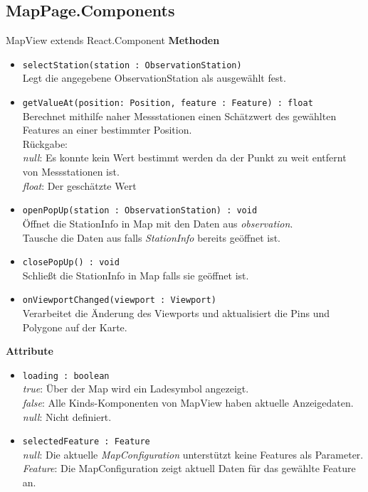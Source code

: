 \subsection{MapPage.Components}

    \begin{Class}{MapView extends React.Component}
        \textbf{Methoden}
        \begin{itemize}
            \item \texttt{selectStation(station : ObservationStation)}
            \\ Legt die angegebene ObservationStation als ausgewählt fest.
            \item \texttt{getValueAt(position: Position, feature : Feature) : float}
            \\ Berechnet mithilfe naher Messstationen einen Schätzwert des gewählten Features an einer bestimmter Position.
            \\ Rückgabe:
            \\ \emph{null}: Es konnte kein Wert bestimmt werden da der Punkt zu weit entfernt von Messstationen ist.
            \\ \emph{float}: Der geschätzte Wert
            \item \texttt{openPopUp(station : ObservationStation) : void}
            \\ Öffnet die StationInfo in Map mit den Daten aus \emph{observation}.
            \\ Tausche die Daten aus falls \emph{StationInfo} bereits geöffnet ist.
            \item \texttt{closePopUp() : void}
            \\ Schließt die StationInfo in Map falls sie geöffnet ist.
            \item \texttt{onViewportChanged(viewport : Viewport)}
            \\ Verarbeitet die Änderung des Viewports und aktualisiert die Pins und Polygone auf der Karte.
        \end{itemize}
        \textbf{Attribute}
        \begin{itemize}
            \item \texttt{loading : boolean}
            \\ \emph{true}: Über der Map wird ein Ladesymbol angezeigt.
            \\ \emph{false}: Alle Kinds-Komponenten von MapView haben aktuelle Anzeigedaten.
            \\ \emph{null}: Nicht definiert.
            \item \texttt{selectedFeature : Feature}
            \\ \emph{null}: Die aktuelle \emph{MapConfiguration} unterstützt keine Features als Parameter.
            \\ \emph{Feature}: Die MapConfiguration zeigt aktuell Daten für das gewählte Feature an.
        \end{itemize}
    \end{Class}

